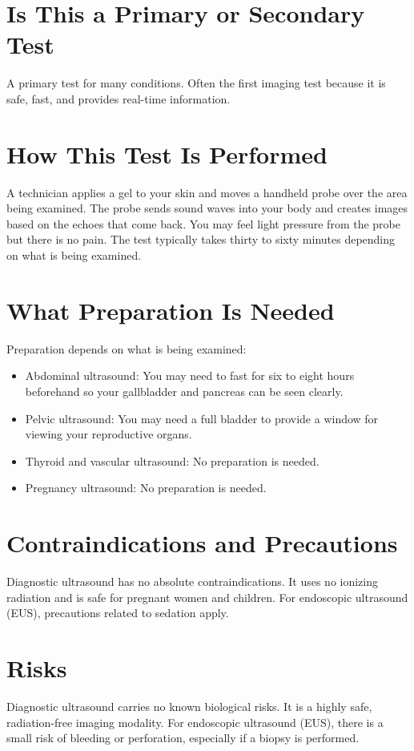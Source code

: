 \section*{Is This a Primary or Secondary Test}
A primary test for many conditions. Often the first imaging test because it is safe, fast, and provides real-time information.

\section*{How This Test Is Performed}
A technician applies a gel to your skin and moves a handheld probe over the area being examined. The probe sends sound waves into your body and creates images based on the echoes that come back. You may feel light pressure from the probe but there is no pain. The test typically takes thirty to sixty minutes depending on what is being examined.

\section*{What Preparation Is Needed}
Preparation depends on what is being examined:
\begin{itemize}
\item Abdominal ultrasound: You may need to fast for six to eight hours beforehand so your gallbladder and pancreas can be seen clearly.
\item Pelvic ultrasound: You may need a full bladder to provide a window for viewing your reproductive organs.
\item Thyroid and vascular ultrasound: No preparation is needed.
\item Pregnancy ultrasound: No preparation is needed.
\end{itemize}

\section*{Contraindications and Precautions}
Diagnostic ultrasound has no absolute contraindications. It uses no ionizing radiation and is safe for pregnant women and children. For endoscopic ultrasound (EUS), precautions related to sedation apply.

\section*{Risks}
Diagnostic ultrasound carries no known biological risks. It is a highly safe, radiation-free imaging modality. For endoscopic ultrasound (EUS), there is a small risk of bleeding or perforation, especially if a biopsy is performed.

